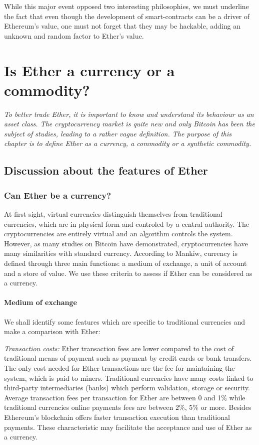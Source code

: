\documentclass[11pt]{report}
\begin{document}
While this major event opposed two interesting philosophies, we must underline the fact that even though the development of smart-contracts can be a driver of Ethereum's value, one must not forget that they may be hackable, adding an unknown and random factor to Ether's value. 



\clearpage
\chapter{Is Ether a currency or a commodity?}


	\textit{To better trade Ether, it is important to know and understand its behaviour as an asset class. \newline The cryptocurrency market is quite new and only Bitcoin has been the subject of studies, leading to a rather vague definition. The purpose of this chapter is to define Ether as a currency, a commodity or a synthetic commodity.}

	\section{Discussion about the features of Ether}
\subsection*{Can Ether be a currency?}

At first sight, virtual currencies distinguish themselves from traditional currencies, which are in physical form and controled by a central authority. The cryptocurrencies are entirely virtual and an algorithm controls the system. However, as many studies on Bitcoin have demonstrated, cryptocurrencies have many similarities with standard currency.  According to Mankiw\cite{MANKIW}, currency is defined through three main functions: a medium of exchange, a unit of account and a store of value. We use these criteria to assess if Ether can be considered as a currency.
\clearpage
\subsubsection*{Medium of exchange}

We shall identify some features which are specific to traditional currencies and make a comparison with Ether:

\textit{Transaction costs:} Ether transaction fees are lower compared to the cost of traditional means of payment such as payment by credit cards or bank transfers. The only cost needed for Ether transactions are the fee for maintaining the system, which is paid to miners. Traditional currencies have many costs linked to third-party intermediaries (banks) which perform validation, storage or security. Average transaction fees per transaction for Ether are between 0 and 1\% while traditional currencies online payments fees are between 2\%, 5\% or more\cite{TAPSCOTT}. Besides Ethereum's blockchain offers faster transaction execution than traditional payments. These characteristic may facilitate the acceptance and use of Ether as a currency. \smallbreak
\end{document}
